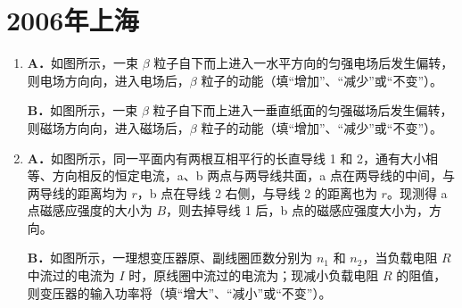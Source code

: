 \documentclass[\gkver]{gaokaozhenti}
\begin{document}
\chapter{2006年上海}

\begin{enumerate}
\item
\textbf{A．}如图所示，一束 $\beta$ 粒子自下而上进入一水平方向的匀强电场后发生偏转，则电场方向向，进入电场后，$\beta$ 粒子的动能（填“增加”、“减少”或“不变”）。

\onepicture[align=right, w=3.15cm]{}

\textbf{B．}如图所示，一束 $\beta$ 粒子自下而上进入一垂直纸面的匀强磁场后发生偏转，则磁场方向向，进入磁场后，$\beta$ 粒子的动能（填“增加”、“减少”或“不变”）。

\onepicture[align=right, w=3.13cm]{}



\item
\textbf{A．}如图所示，同一平面内有两根互相平行的长直导线 1 和 2，通有大小相等、方向相反的恒定电流，a、b 两点与两导线共面，a 点在两导线的中间，与两导线的距离均为 $r$，b 点在导线 2 右侧，与导线 2 的距离也为 $r$。现测得 a 点磁感应强度的大小为 $B$，则去掉导线 1 后，b 点的磁感应强度大小为，方向。

\onepicture[align=right, w=4.20cm]{}

\textbf{B．}如图所示，一理想变压器原、副线圈匝数分别为 $n_{1}$ 和 $n_{2}$，当负载电阻 $R$ 中流过的电流为 $I$ 时，原线圈中流过的电流为；现减小负载电阻 $R$ 的阻值，则变压器的输入功率将（填“增大”、“减小”或“不变”）。


\end{enumerate}
\end{document}
